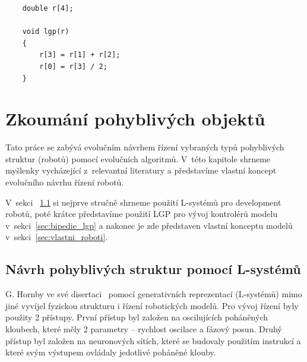 
\begin{lstlisting}
    double r[4];

    void lgp(r)
    {
        r[3] = r[1] + r[2];
        r[0] = r[3] / 2;
    }
\end{lstlisting}


\chapter{Zkoumání pohyblivých objektů}
\label{chap:zkoumani_pohyblivych_objektu}

Tato práce se zabývá evolučním návrhem řízení vybraných typů pohyblivých struktur (robotů) pomocí evolučních algoritmů.
V~této kapitole shrneme myšlenky vycházející z~relevantní literatury a představíme vlastní koncept evolučního návrhu řízení robotů.

V~sekci ~\ref{sec:l_systemy} si nejprve stručně shrneme použití L-systémů pro development robotů, poté krátce představíme použití LGP pro vývoj kontrolérů modelu v~sekci~\ref{sec:bipedie_lgp} a nakonec je zde představen vlastní konceptu modelů v~sekci~\ref{sec:vlastni_roboti}.

\section{Návrh pohyblivých struktur pomocí L-systémů}
\label{sec:l_systemy}

G. Hornby ve své disertaci~\cite{Hornby2003} pomocí generativních reprezentací (L-systémů) mimo jiné vyvíjel fyzickou strukturu i řízení robotických modelů.
Pro vývoj řízení byly použity 2 přístupy.
První přístup byl založen na oscilujících poháněných kloubech, které měly 2 parametry -- rychlost oscilace a fázový posun.
Druhý přístup byl založen na neuronových sítích, které se budovaly použitím instrukcí a které svým výstupem ovládaly jedotlivé poháněné klouby.

